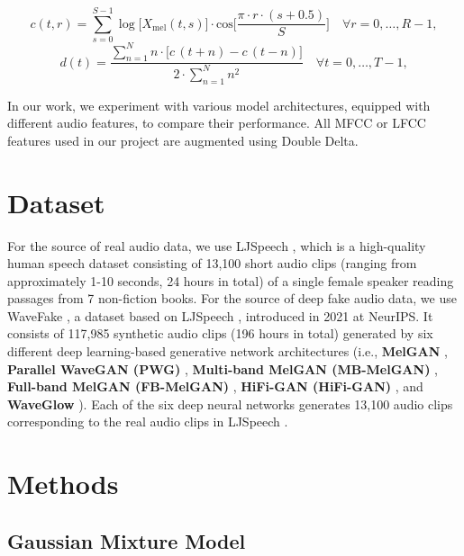 \documentclass{article}
\newcommand{\toolstyling}[1]{#1}
\newcommand{\Mel}{\toolstyling{MelGAN}}
\newcommand{\PWG}{\toolstyling{PWG}}
\newcommand{\MBMel}{\toolstyling{MB-MelGAN}}
\newcommand{\FBMel}{\toolstyling{FB-MelGAN}}
\newcommand{\hifi}{\toolstyling{HiFi-GAN}}
\begin{document}
\begin{equation}\label{equation:mfcc}
    c(t, r) = \sum_{s=0}^{S-1}\log\big[X_{\mathrm{mel}}(t,s)\big] \cdot \text{cos}\bigg[\frac{\pi \cdot r\cdot(s+0.5)}{S}\bigg] \quad \forall  r = 0,\dots, R-1,
\end{equation}
\begin{equation}\label{equation:delta}
    d(t) = \frac{\sum_{n=1}^N n\cdot\big[c\,(t+n)-c\,(t-n)\big]}{2\cdot\sum_{n=1}^N n^2} \quad \forall  t = 0,\dots, T-1,
\end{equation}

In our work, we experiment with various model architectures, equipped with different audio features, to compare their performance. All MFCC or LFCC features used in our project are augmented using Double Delta.

\section{Dataset}

For the source of real audio data, we use LJSpeech \cite{ljspeech17}, which is a high-quality human speech dataset consisting of 13,100 short audio clips (ranging from approximately 1-10 seconds, 24 hours in total) of a single female speaker reading passages from 7 non-fiction books. For the source of deep fake audio data, we use WaveFake \cite{frank2021wavefake}, a dataset based on LJSpeech \cite{ljspeech17}, introduced in 2021 at NeurIPS. It consists of 117,985 synthetic audio clips (196 hours in total) generated by six different deep learning-based generative network architectures (i.e., \textbf{\Mel{}} \cite{kumar2019melgan}, \textbf{Parallel WaveGAN (\PWG{})} \cite{van2016wavenet}, \textbf{Multi-band MelGAN (\MBMel{})} \cite{frank2021wavefake}, \textbf{Full-band MelGAN (\FBMel{})} \cite{frank2021wavefake}, \textbf{HiFi-GAN (\hifi{})} \cite{kong2020hifi}, and \textbf{WaveGlow} \cite{kingma2018glow}). Each of the six deep neural networks generates 13,100 audio clips corresponding to the real audio clips in LJSpeech \cite{ljspeech17}.

\section{Methods}

\subsection{Gaussian Mixture Model}
\end{document}
